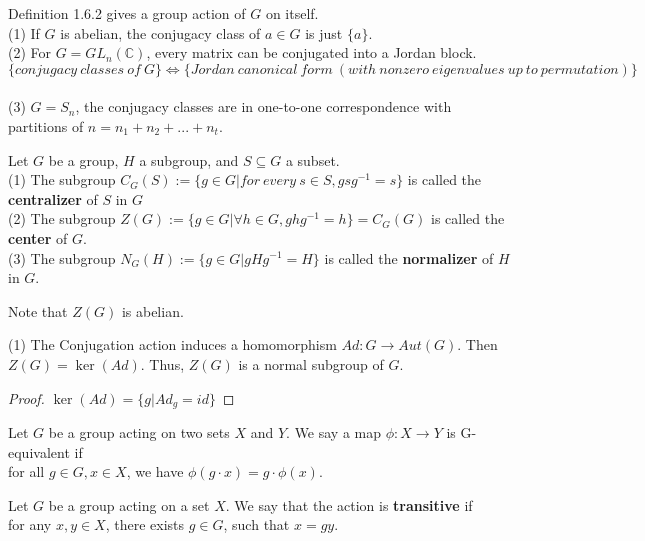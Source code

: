 \documentclass[11pt,fleqn]{book} %
\begin{document}
\begin{CJK}{UTF8}{gkai}
\begin{example}
	 Definition 1.6.2 gives a group action of $G$ on itself. \\
	(1) If $G$ is abelian, the conjugacy class of $a\in G$ is just $\{a\}$. \\
	(2) For $G = GL_n(\mathbb{C})$, every matrix can be conjugated into a Jordan block. \[
		\{conjugacy \ classes \ of \ G\} \iff \{Jordan \ canonical\ form \ (with \ nonzero \ eigenvalues \ up \ to \ permutation)\} \] \\
	(3) $G = S_n$, the conjugacy classes are in one-to-one correspondence with partitions of $n = n_1 + n_2 + ... + n_t$.
\end{example}

\begin{definition}
	 Let $G$ be a group, $H$ a subgroup, and $S \subseteq G$ a subset.  \\
	(1) The subgroup $C_G(S) :=\{g\in G | for \ every \ s \in S, gsg^{-1} = s\}$ is called the {\bf centralizer} of $S$ in $G$\\
	(2) The subgroup $Z(G) :=\{g\in G | \forall h \in G, ghg^{-1} = h\} = C_G(G)$ is called the {\bf center} of $G$. \\
	(3) The subgroup $N_G(H) := \{g \in G | gHg^{-1} = H\}$ is called the {\bf normalizer} of $H$ in $G$.
\end{definition}

\begin{remark}
	Note that $Z(G)$ is abelian.
\end{remark}
\begin{proposition}
	(1) The Conjugation action induces a homomorphism $Ad: G \to Aut(G)$. Then $Z(G) = \ker (Ad)$. Thus, $Z(G)$ is a normal subgroup of $G$.
\end{proposition}
\begin{proof}
	$\ker (Ad) = \{g | Ad_g = id\}$	
\end{proof}

\begin{definition}
	[G-equivariant] Let $G$ be a group acting on two sets $X$ and $Y$. We say a map $\phi: X \to Y$ is G-equivalent if \\
	for all $g\in G, x \in X$, we have $\phi(g\cdot x) = g\cdot \phi(x)$.
\end{definition}

\begin{definition}
	[transitive] Let $G$ be a group acting on a set $X$. We say that the action is {\bf transitive} if \\
	for any $x,y \in X$, there exists $g \in G$, such that $x = gy$.
\end{definition}


\end{CJK}
\end{document}
